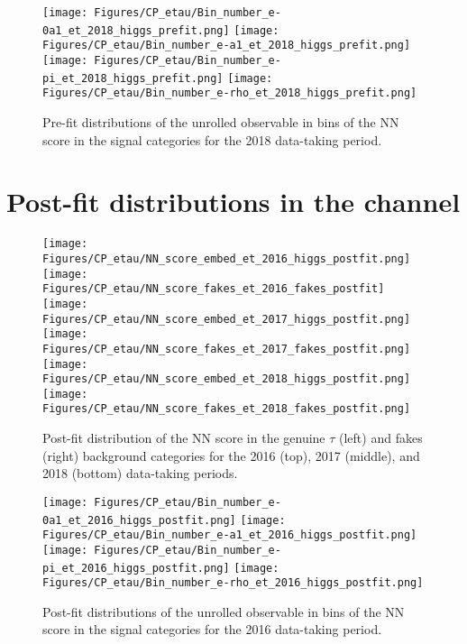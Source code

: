 \begin{figure}[H]
    \centering
    \texttt{[image: Figures/CP\_etau/Bin\_number\_e-0a1\_et\_2018\_higgs\_prefit.png]}
    \texttt{[image: Figures/CP\_etau/Bin\_number\_e-a1\_et\_2018\_higgs\_prefit.png]}
    \texttt{[image: Figures/CP\_etau/Bin\_number\_e-pi\_et\_2018\_higgs\_prefit.png]}
    \texttt{[image: Figures/CP\_etau/Bin\_number\_e-rho\_et\_2018\_higgs\_prefit.png]}
    \caption{Pre-fit distributions of the unrolled \phicp observable in bins of the NN score in the signal categories for the 2018 data-taking period.}
\end{figure}

\newpage
\section{Post-fit distributions in the \et channel}\label{app:post-fit}

\begin{figure}[H]
    \centering
    \texttt{[image: Figures/CP\_etau/NN\_score\_embed\_et\_2016\_higgs\_postfit.png]}
    \texttt{[image: Figures/CP\_etau/NN\_score\_fakes\_et\_2016\_fakes\_postfit]}
    \texttt{[image: Figures/CP\_etau/NN\_score\_embed\_et\_2017\_higgs\_postfit.png]}
    \texttt{[image: Figures/CP\_etau/NN\_score\_fakes\_et\_2017\_fakes\_postfit.png]}
    \texttt{[image: Figures/CP\_etau/NN\_score\_embed\_et\_2018\_higgs\_postfit.png]}
    \texttt{[image: Figures/CP\_etau/NN\_score\_fakes\_et\_2018\_fakes\_postfit.png]}
    \caption{Post-fit distribution of the NN score in the genuine $\tau$ (left) and fakes (right) background categories for the 2016 (top), 2017 (middle), and 2018 (bottom) data-taking periods.}
\end{figure}

\begin{figure}[H]
    \centering
    \texttt{[image: Figures/CP\_etau/Bin\_number\_e-0a1\_et\_2016\_higgs\_postfit.png]}
    \texttt{[image: Figures/CP\_etau/Bin\_number\_e-a1\_et\_2016\_higgs\_postfit.png]}
    \texttt{[image: Figures/CP\_etau/Bin\_number\_e-pi\_et\_2016\_higgs\_postfit.png]}
    \texttt{[image: Figures/CP\_etau/Bin\_number\_e-rho\_et\_2016\_higgs\_postfit.png]}
    \caption{Post-fit distributions of the unrolled \phicp observable in bins of the NN score in the signal categories for the 2016 data-taking period.}
\end{figure}

